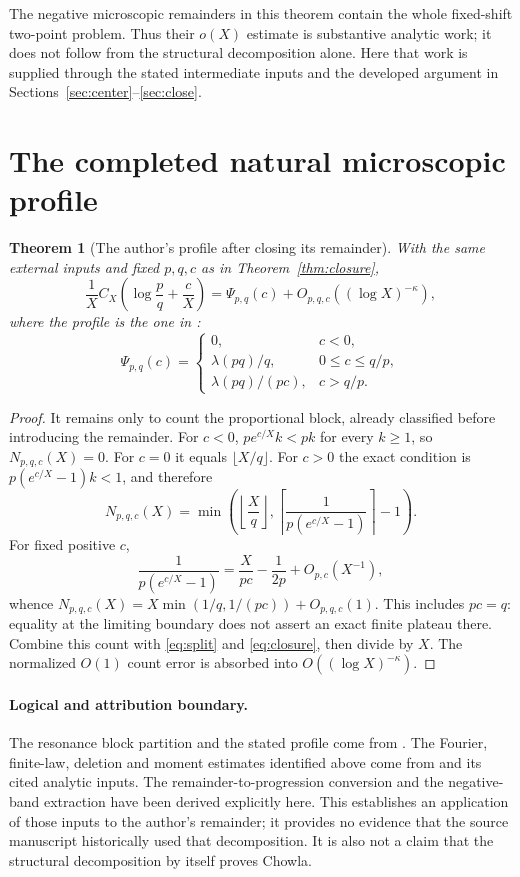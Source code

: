 \documentclass[11pt,a4paper]{article}
\numberwithin{equation}{section}
\newtheorem{theorem}{Theorem}[section]
\theoremstyle{remark}\newtheorem{remark}[theorem]{Remark}
\newcommand{\1}{\mathbf 1}
\begin{document}
The negative microscopic remainders in this theorem contain the whole
fixed-shift two-point problem. Thus their $o(X)$ estimate is substantive
analytic work; it does not follow from the structural decomposition
alone. Here that work is supplied through the stated intermediate
inputs and the developed argument in Sections~\ref{sec:center}--\ref{sec:close}.

\section{The completed natural microscopic profile}
\label{sec:profile}

\begin{theorem}[The author's profile after closing its remainder]
\label{thm:profile}
With the same external inputs and fixed $p,q,c$ as in
Theorem~\ref{thm:closure},
\begin{equation}\label{eq:profile}
 \frac1X C_X\left(\log\frac pq+\frac cX\right)
 =\Psi_{p,q}(c)+O_{p,q,c}((\log X)^{-\kappa}),
\end{equation}
where the profile is the one in \cite[Theorem 5.1]{resonance}:
\[
 \Psi_{p,q}(c)=
 \begin{cases}
 0,&c<0,\\
 \lambda(pq)/q,&0\le c\le q/p,\\
 \lambda(pq)/(pc),&c>q/p.
 \end{cases}
\]
\end{theorem}
\begin{proof}
It remains only to count the proportional block, already classified
before introducing the remainder. For $c<0$, $pe^{c/X}k<pk$ for
every $k\ge1$, so $N_{p,q,c}(X)=0$. For $c=0$ it equals
$\lfloor X/q\rfloor$. For $c>0$ the exact condition is
$p(e^{c/X}-1)k<1$, and therefore
\[
 N_{p,q,c}(X)=\min\left(\left\lfloor\frac Xq\right\rfloor,
 \left\lceil\frac1{p(e^{c/X}-1)}\right\rceil-1\right).
\]
For fixed positive $c$,
\[
 \frac1{p(e^{c/X}-1)}=\frac X{pc}-\frac1{2p}+O_{p,c}(X^{-1}),
\]
whence $N_{p,q,c}(X)=X\min(1/q,1/(pc))+O_{p,q,c}(1)$.
This includes $pc=q$: equality at the limiting boundary does not
assert an exact finite plateau there. Combine this count with
\eqref{eq:split} and \eqref{eq:closure}, then divide by $X$.
The normalized $O(1)$ count error is absorbed into
$O((\log X)^{-\kappa})$.
\end{proof}

\paragraph{Logical and attribution boundary.}
The resonance block partition and the stated profile come from
\cite{resonance}. The Fourier, finite-law, deletion and moment estimates
identified above come from \cite{final} and its cited analytic inputs.
The remainder-to-progression conversion and the negative-band extraction
have been derived explicitly here. This establishes an application
of those inputs to the author's remainder; it provides no evidence
that the source manuscript historically used that decomposition.
It is also not a claim that the structural decomposition by itself
proves Chowla.
\end{document}
